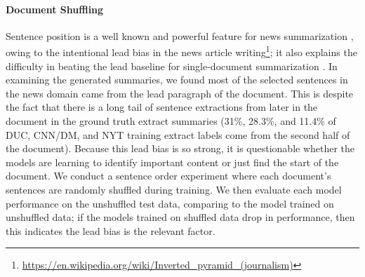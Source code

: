 

 
\paragraph{Document Shuffling} Sentence position is a well known and 
powerful feature for news summarization \cite{hong2014improving}, owing 
to the intentional lead bias in the news article writing\footnote{\url{https://en.wikipedia.org/wiki/Inverted_pyramid_(journalism)}}; it also explains the difficulty in beating
the lead baseline for single-document summarization 
\cite{nenkova2005automatic,rau:1999}.
In examining the generated summaries, we found
most of the selected sentences in the news domain came from the lead paragraph
of the document. This is despite the fact that there is a long tail of 
sentence extractions from later in the document in the ground truth extract 
summaries (31\%, 28.3\%, and 11.4\% of DUC, CNN/DM, and NYT training extract labels come 
from the second half of the document). 
Because this lead bias is so strong, it is questionable whether
the models are learning to identify important content or just find the start
of the document. We conduct a sentence order experiment where 
each document's sentences are randomly shuffled during training. We then
evaluate each model performance on the unshuffled test data, comparing to 
the model trained on unshuffled data; if the models trained on shuffled data
drop in performance, then this indicates the lead bias is the relevant factor.

